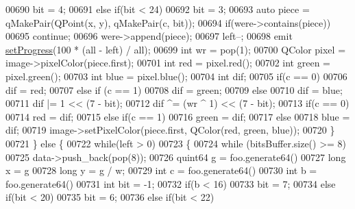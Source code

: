 \begin{DoxyCode}
00690                 bit = 4;
00691             \textcolor{keywordflow}{else} \textcolor{keywordflow}{if}(bit < 24)
00692                 bit = 3;
00693             \textcolor{keyword}{auto} piece = qMakePair(QPoint(x, y), qMakePair(c, bit));
00694             \textcolor{keywordflow}{if}(were->contains(piece))
00695                 \textcolor{keywordflow}{continue};
00696             were->append(piece);
00697             left--;
00698             emit \hyperlink{class_model_p_c_afdcd80f0ed5062e145a71f09b0897547}{setProgress}(100 * (all - left) / all);
00699             \textcolor{keywordtype}{int} wr = pop(1);
00700             QColor pixel = image->pixelColor(piece.first);
00701             \textcolor{keywordtype}{int} red = pixel.red();
00702             \textcolor{keywordtype}{int} green = pixel.green();
00703             \textcolor{keywordtype}{int} blue = pixel.blue();
00704             \textcolor{keywordtype}{int} dif;
00705             \textcolor{keywordflow}{if}(c == 0)
00706                 dif = red;
00707             \textcolor{keywordflow}{else} \textcolor{keywordflow}{if} (c == 1)
00708                 dif = green;
00709             \textcolor{keywordflow}{else}
00710                 dif = blue;
00711             dif |= 1 << (7 - bit);
00712             dif ^= (wr ^ 1) << (7 - bit);
00713             \textcolor{keywordflow}{if}(c == 0)
00714                 red = dif;
00715             \textcolor{keywordflow}{else} \textcolor{keywordflow}{if}(c == 1)
00716                 green = dif;
00717             \textcolor{keywordflow}{else}
00718                 blue = dif;
00719             image->setPixelColor(piece.first, QColor(red, green, blue));
00720         \}
00721     \} \textcolor{keywordflow}{else} \{
00722         \textcolor{keywordflow}{while}(left > 0)
00723         \{
00724             \textcolor{keywordflow}{while} (bitsBuffer.size() >= 8)
00725                 data->push\_back(pop(8));
00726             quint64 g = foo.generate64() %
00727             \textcolor{keywordtype}{long} x = g %
00728             \textcolor{keywordtype}{long} y = g / w;
00729             \textcolor{keywordtype}{int} c = foo.generate64() %
00730             \textcolor{keywordtype}{int} b = foo.generate64() %
00731             \textcolor{keywordtype}{int} bit = -1;
00732             \textcolor{keywordflow}{if}(b < 16)
00733                 bit = 7;
00734             \textcolor{keywordflow}{else} \textcolor{keywordflow}{if}(bit < 20)
00735                 bit = 6;
00736             \textcolor{keywordflow}{else} \textcolor{keywordflow}{if}(bit < 22)

\end{DoxyCode}
